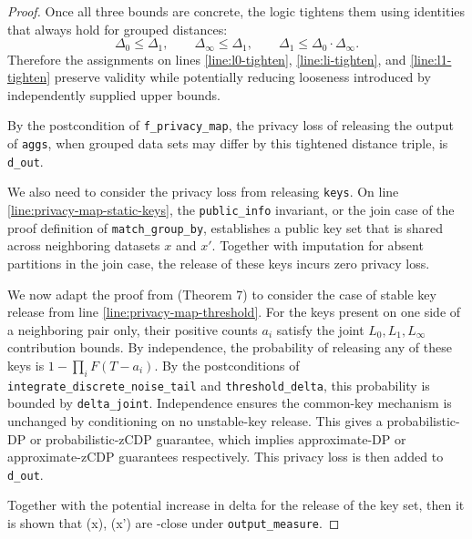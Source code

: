 \documentclass{article}
\begin{document}
\begin{proof}
Once all three bounds are concrete, the logic tightens them using identities that always hold for grouped distances:
\[
    \Delta_0 \le \Delta_1, \qquad \Delta_\infty \le \Delta_1, \qquad \Delta_1 \le \Delta_0 \cdot \Delta_\infty.
\]
Therefore the assignments on lines \ref{line:l0-tighten}, \ref{line:li-tighten}, and \ref{line:l1-tighten}
preserve validity while potentially reducing looseness introduced by independently supplied upper bounds.

By the postcondition of \texttt{f\_privacy\_map}, the privacy loss of releasing the output of \texttt{aggs},
when grouped data sets may differ by this tightened distance triple,
is \texttt{d\_out}.

We also need to consider the privacy loss from releasing \texttt{keys}.
On line \ref{line:privacy-map-static-keys}, the \texttt{public\_info} invariant,
or the join case of the proof definition of \texttt{match\_group\_by},
establishes a public key set that is shared across neighboring datasets $x$ and $x'$.
Together with imputation for absent partitions in the join case,
the release of these keys incurs zero privacy loss.

We now adapt the proof from \cite{rogers2023unifyingprivacyanalysisframework} (Theorem 7)
to consider the case of stable key release from line \ref{line:privacy-map-threshold}.
For the keys present on one side of a neighboring pair only, their positive counts $a_i$ satisfy the joint $L_0,L_1,L_\infty$ contribution bounds.
By independence, the probability of releasing any of these keys is $1-\prod_i F(T-a_i)$.
By the postconditions of \texttt{integrate\_discrete\_noise\_tail} and \texttt{threshold\_delta}, this probability is bounded by \texttt{delta\_joint}.
Independence ensures the common-key mechanism is unchanged by conditioning on no unstable-key release.
This gives a probabilistic-DP or probabilistic-zCDP guarantee,
which implies approximate-DP or approximate-zCDP guarantees respectively.
This privacy loss is then added to \texttt{d\_out}.

Together with the potential increase in delta for the release of the key set,
then it is shown that \function(x), \function(x') are \dout-close under \texttt{output\_measure}.

\end{proof}



\end{document}
